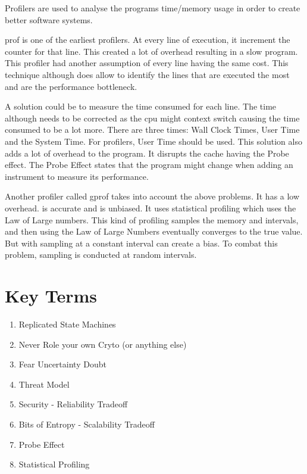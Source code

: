 \documentclass[twoside]{article}
\begin{document}
Profilers are used to analyse the programs time/memory usage in order to create better software systems. 

prof is one of the earliest profilers. At every line of execution, it increment the counter for that line. This created a lot of overhead resulting in a slow program. This profiler had another assumption of every line having the same cost. This technique although does allow to identify the lines that are executed the most and are the performance bottleneck. 

A solution could be to measure the time consumed for each line. The time although needs to be corrected as the cpu might context switch causing the time consumed to be a lot more. There are three times: Wall Clock Times, User Time and the System Time. For profilers, User Time should be used. This solution also adds a lot of overhead to the program. It disrupts the cache having the Probe effect. The Probe Effect states that the program might change when adding an instrument to measure its performance. 

Another profiler called gprof takes into account the above problems. It has a low overhead. is accurate and is unbiased. It uses statistical profiling which uses the Law of Large numbers. This kind of profiling samples the memory and intervals, and then using the Law of Large Numbers eventually converges to the true value. But with sampling at a constant interval can create a bias. To combat this problem, sampling is conducted at random intervals. 
\section{Key Terms}

\begin{enumerate}
    \item Replicated State Machines 
    \item Never Role your own Cryto (or anything else)
    \item Fear Uncertainty Doubt
    \item Threat Model
    \item Security - Reliability Tradeoff
    \item Bits of Entropy - Scalability Tradeoff
    \item Probe Effect
    \item Statistical Profiling
\end{enumerate}{}
\end{document}

